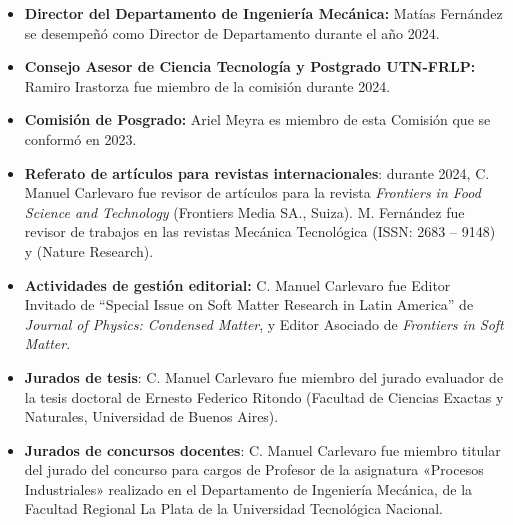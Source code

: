 \documentclass[a4paper,11pt,twoside,final,titlepage,onecolumn,openright]{report}
\begin{document}
\begin{itemize}
    \item \textbf{Director del Departamento de Ingeniería Mecánica:} Matías Fernández se desempeñó como Director de Departamento durante el año 2024.

  \item \textbf{Consejo Asesor de Ciencia Tecnología y Postgrado UTN-FRLP:} Ramiro Irastorza fue miembro de la comisión durante 2024. 

\item \textbf{Comisión de Posgrado:} Ariel Meyra es miembro de esta Comisión que se conformó en 2023.
  
\item \textbf{Referato de artículos para revistas internacionales}: durante 2024, C. Manuel Carlevaro fue revisor de artículos para la revista \textit{Frontiers in Food Science and Technology} (Frontiers Media SA., Suiza). M. Fernández fue revisor de trabajos en las revistas Mecánica Tecnológica (ISSN: 2683 – 9148) y  (Nature Research).
 
\item \textbf{Actividades de gestión editorial:} C. Manuel Carlevaro fue Editor Invitado de ``Special Issue on Soft Matter Research in Latin America'' de \textit{Journal of Physics: Condensed Matter}, y Editor Asociado de \textit{Frontiers in Soft Matter}.
 

\item \textbf{Jurados de tesis}: C. Manuel Carlevaro fue miembro del jurado evaluador de la tesis doctoral de Ernesto Federico Ritondo (Facultad de Ciencias Exactas y Naturales, Universidad de Buenos Aires).

\item \textbf{Jurados de concursos docentes}: C. Manuel Carlevaro fue miembro titular del jurado del concurso para cargos de Profesor de la asignatura «Procesos Industriales» realizado en el Departamento de Ingeniería Mecánica, de la Facultad Regional La Plata de la Universidad Tecnológica Nacional.

 

\end{itemize}
\end{document}
